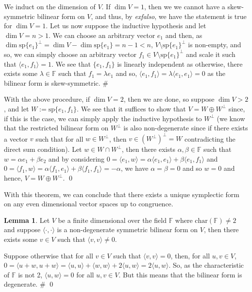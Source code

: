 \documentclass[
]{article}
\theoremstyle{definition}
\newtheorem{lemma}{Lemma}[section]
\theoremstyle{definition}
\begin{document}
We induct on the dimension of \(V\). If \(\dim V = 1\), then we we
cannot have a skew-symmetric bilinear form on \(V\), and thus, by
\emph{exfalso}, we have the statement is true for \(\dim V = 1\). Let us
now suppose the inductive hypothesis and let \(\dim V = n > 1\). We can
choose an arbitrary vector \(e_1\) and then, as
\(\dim \text{sp}\{e_1\}^\bot = \dim V - \dim \text{sp}\{e_1\} = n - 1 < n\),
\(V \setminus \text{sp}\{e_1\}^\bot\) is non-empty, and so, we can
simply choose an arbitrary vector
\(f_1 \in V \setminus \text{sp}\{e_1\}^\bot\) and scale it such that
\(\langle e_1, f_1 \rangle = 1\). We see that \(\{e_1, f_1\}\) is
linearly independent as otherwise, there exists some
\(\lambda \in \mathbb{F}\) such that \(f_1 = \lambda e_1\) and so,
\(\langle e_1, f_1 \rangle =  \lambda\langle e_1, e_1 \rangle = 0\) as
the bilinear form is skew-symmetric. \#

With the above procedure, if \(\dim V = 2\), then we are done, so
suppose \(\dim V > 2\), and let \(W := \text{sp}\{e_1, f_1\}\). We see
that it suffices to show that \(V = W \oplus W^\bot\) since, if this is
the case, we can simply apply the inductive hypothesis to \(W^\bot\) (we
know that the restricted bilinear form on \(W^\bot\) is also
non-degenerate since if there exists a vector \(v\) such that for all
\(w \in W^\bot\), then \(v \in (W^\bot)^\bot = W\) contradicting the
direct sum condition). Let \(w \in W \cap W^\bot\), then there exists
\(\alpha, \beta \in \mathbb{F}\) such that
\(w = \alpha e_1 + \beta e_2\) and by considering
\(0 = \langle e_1, w \rangle = \alpha \langle e_1, e_1 \rangle + \beta \langle e_1, f_1 \rangle\)
and
\(0 = \langle f_1, w \rangle = \alpha \langle f_1, e_1 \rangle + \beta \langle f_1, f_1 \rangle = -\alpha\),
we have \(\alpha = \beta = 0\) and so \(w = 0\) and hence,
\(V = W \oplus W^\bot\). \qed

With this theorem, we can conclude that there exists a unique symplectic
form on any even dimensional vector spaces up to congruence.

\begin{lemma}
  Let \(V\) be a finite dimensional over the field \(\mathbb{F}\) where 
  \(\text{char}(\mathbb{F}) \neq 2\) and suppose \(\langle \cdot, \cdot \rangle\) 
  is a non-degenerate symmetric bilinear form on \(V\), then there exists some 
  \(v \in V\) such that \(\langle v, v \rangle \neq 0\).
\end{lemma}
\proof

Suppose otherwise that for all \(v \in V\) such that
\(\langle v, v \rangle = 0\), then, for all \(u, v \in V\),
\(0 = \langle u + w, u + w \rangle =  \langle u, u \rangle + \langle w, w \rangle + 2\langle u, w \rangle  = 2\langle u, w \rangle\).
So, as the characteristic of \(\mathbb{F}\) is not 2,
\(\langle u, w \rangle = 0\) for all \(u, v \in V\). But this means that
the bilinear form is degenerate. \# \qed
\end{document}
